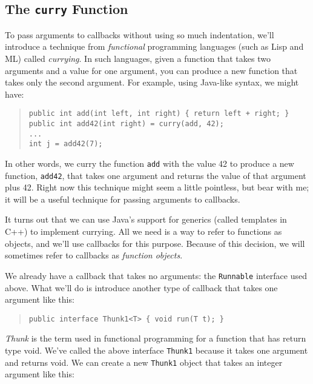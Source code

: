 \documentclass[11pt]{article}
\begin{document}
\subsection{The \texttt{curry} Function}

To pass arguments to callbacks without using so much indentation, we'll
introduce a technique from \emph{functional} programming languages (such
as Lisp and ML) called \emph{currying}.  In such languages, given a
function that takes two arguments and a value for one argument, you can
produce a new function that takes only the second argument.  For
example, using Java-like syntax, we might have:

\begin{quote}
\lstset{language=Java, basicstyle=\small}
\begin{lstlisting}  
public int add(int left, int right) { return left + right; }
public int add42(int right) = curry(add, 42);
...
int j = add42(7);
\end{lstlisting}
\end{quote}

In other words, we curry the function \texttt{add} with the value 42 to
produce a new function, \texttt{add42}, that takes one argument and
returns the value of that argument plus 42.  Right now this technique
might seem a little pointless, but bear with me; it will be a useful
technique for passing arguments to callbacks.

It turns out that we can use Java's support for generics (called
templates in C++) to implement currying.  All we need is a way to refer
to functions as objects, and we'll use callbacks for this purpose.
Because of this decision, we will sometimes refer to callbacks as
\emph{function objects}.

We already have a callback that takes no arguments: the
\texttt{Runnable} interface used above.  What we'll do is introduce
another type of callback that takes one argument like this:

\begin{quote}
\lstset{language=Java, basicstyle=\small}
\begin{lstlisting}  
public interface Thunk1<T> { void run(T t); }
\end{lstlisting}
\end{quote}

\emph{Thunk} is the term used in functional programming for a function
that has return type void.  We've called the above interface
\texttt{Thunk1} because it takes one argument and returns void.  We can
create a new \texttt{Thunk1} object that takes an integer argument like
this:
\end{document}
